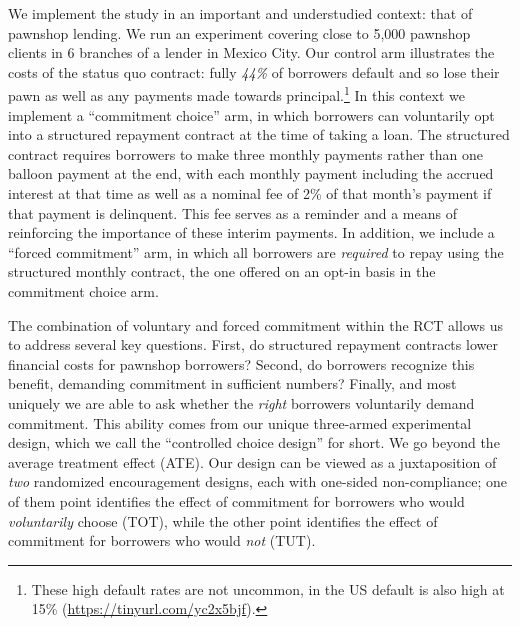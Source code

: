 \documentclass[oneside,11pt]{article}
\begin{document}
We implement the study in an important and understudied context: that of pawnshop lending. We run an experiment covering close to 5,000 pawnshop clients in 6 branches of a lender in Mexico City. Our control arm illustrates the costs of the status quo contract: fully \emph{44\%} of borrowers default and so lose their pawn as well as any payments made towards principal.\footnote{These high default rates are not uncommon, in the US default is also high at 15\% (\url{https://tinyurl.com/yc2x5bjf}).} In this context we implement a ``commitment choice'' arm, in which borrowers can voluntarily opt into a structured repayment contract at the time of taking a loan. The structured contract requires borrowers to make three monthly payments rather than one balloon payment at the end, with each monthly payment including the accrued interest at that time as well as a nominal fee of 2\% of that month's payment if that payment is delinquent. This fee serves as a reminder and a means of reinforcing the importance of these interim payments. In addition, we include a ``forced commitment'' arm, in which all borrowers are \emph{required} to repay using the structured monthly contract, the one offered on an opt-in basis in the commitment choice arm. 

The combination of voluntary and forced commitment within the RCT allows us to address several key questions. First, do structured repayment contracts lower financial costs for pawnshop borrowers? Second, do borrowers recognize this benefit, demanding commitment in sufficient numbers?  Finally, and most uniquely we are able to ask whether the \textit{right} borrowers voluntarily demand commitment. This ability comes from our unique three-armed experimental design, which we call the ``controlled choice design'' for short.  We go beyond the average treatment effect (ATE). Our design can be viewed as a juxtaposition of \emph{two} randomized encouragement designs, each with one-sided non-compliance; one of them point identifies the effect of commitment for borrowers who would \emph{voluntarily} choose (TOT),
while the other point identifies the effect of commitment for borrowers who would \emph{not} (TUT).
\end{document}
